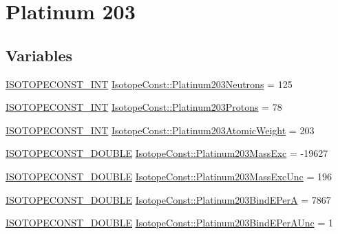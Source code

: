 \hypertarget{group___isotope_const-_platinum-_pt203}{}\section{Platinum 203}
\label{group___isotope_const-_platinum-_pt203}
\subsection*{Variables}
\begin{DoxyCompactItemize}
\item 
\mbox{\hyperlink{group___isotope_const-_macros_ga5f18360b3e99483a35c32d789e62621c}{I\+S\+O\+T\+O\+P\+E\+C\+O\+N\+S\+T\+\_\+\+I\+NT}} \mbox{\hyperlink{group___isotope_const-_platinum-_pt203_ga09b123e07023b512bea3ca1409421c15}{Isotope\+Const\+::\+Platinum203\+Neutrons}} = 125
\item 
\mbox{\hyperlink{group___isotope_const-_macros_ga5f18360b3e99483a35c32d789e62621c}{I\+S\+O\+T\+O\+P\+E\+C\+O\+N\+S\+T\+\_\+\+I\+NT}} \mbox{\hyperlink{group___isotope_const-_platinum-_pt203_gac74c5d5ea40232ebc4c77232a107ce1f}{Isotope\+Const\+::\+Platinum203\+Protons}} = 78
\item 
\mbox{\hyperlink{group___isotope_const-_macros_ga5f18360b3e99483a35c32d789e62621c}{I\+S\+O\+T\+O\+P\+E\+C\+O\+N\+S\+T\+\_\+\+I\+NT}} \mbox{\hyperlink{group___isotope_const-_platinum-_pt203_ga9b0661300790087ea2562b7841c45aed}{Isotope\+Const\+::\+Platinum203\+Atomic\+Weight}} = 203
\item 
\mbox{\hyperlink{group___isotope_const-_macros_ga8f45a7272ce02c0b4c65c44636ed719a}{I\+S\+O\+T\+O\+P\+E\+C\+O\+N\+S\+T\+\_\+\+D\+O\+U\+B\+LE}} \mbox{\hyperlink{group___isotope_const-_platinum-_pt203_gaa9747d086a36bd24b690680613c09dee}{Isotope\+Const\+::\+Platinum203\+Mass\+Exc}} = -\/19627
\item 
\mbox{\hyperlink{group___isotope_const-_macros_ga8f45a7272ce02c0b4c65c44636ed719a}{I\+S\+O\+T\+O\+P\+E\+C\+O\+N\+S\+T\+\_\+\+D\+O\+U\+B\+LE}} \mbox{\hyperlink{group___isotope_const-_platinum-_pt203_ga6d818baa2f830ab4dfae93fb7eda7ac7}{Isotope\+Const\+::\+Platinum203\+Mass\+Exc\+Unc}} = 196
\item 
\mbox{\hyperlink{group___isotope_const-_macros_ga8f45a7272ce02c0b4c65c44636ed719a}{I\+S\+O\+T\+O\+P\+E\+C\+O\+N\+S\+T\+\_\+\+D\+O\+U\+B\+LE}} \mbox{\hyperlink{group___isotope_const-_platinum-_pt203_ga3193650b809dea3aa839fd208190160a}{Isotope\+Const\+::\+Platinum203\+Bind\+E\+PerA}} = 7867
\item 
\mbox{\hyperlink{group___isotope_const-_macros_ga8f45a7272ce02c0b4c65c44636ed719a}{I\+S\+O\+T\+O\+P\+E\+C\+O\+N\+S\+T\+\_\+\+D\+O\+U\+B\+LE}} \mbox{\hyperlink{group___isotope_const-_platinum-_pt203_gaa86ede3a03034a5578d50eb65cfb74e6}{Isotope\+Const\+::\+Platinum203\+Bind\+E\+Per\+A\+Unc}} = 1

\end{DoxyCompactItemize}

